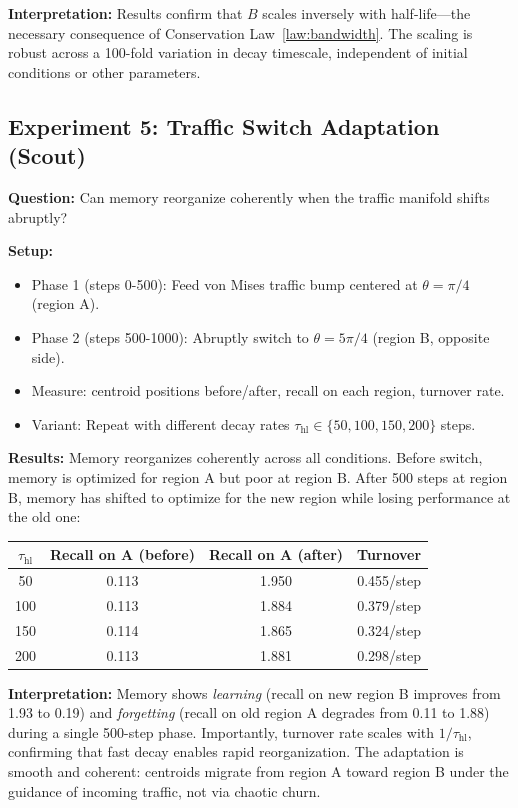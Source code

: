 \documentclass[11pt]{article}
\begin{document}
\textbf{Interpretation:}
Results confirm that $B$ scales inversely with half-life---the necessary consequence of Conservation Law~\ref{law:bandwidth}. The scaling is robust across a 100-fold variation in decay timescale, independent of initial conditions or other parameters.

\subsection{Experiment 5: Traffic Switch Adaptation (Scout)}

\textbf{Question:} Can memory reorganize coherently when the traffic manifold shifts abruptly?

\textbf{Setup:}
\begin{itemize}
  \item Phase 1 (steps 0-500): Feed von Mises traffic bump centered at $\theta = \pi/4$ (region A).
  \item Phase 2 (steps 500-1000): Abruptly switch to $\theta = 5\pi/4$ (region B, opposite side).
  \item Measure: centroid positions before/after, recall on each region, turnover rate.
  \item Variant: Repeat with different decay rates $\tau_{\text{hl}} \in \{50, 100, 150, 200\}$ steps.
\end{itemize}

\textbf{Results:}
Memory reorganizes coherently across all conditions. Before switch, memory is optimized for region A but poor at region B. After 500 steps at region B, memory has shifted to optimize for the new region while losing performance at the old one:

\begin{center}
\begin{tabular}{cccc}
\toprule
$\tau_{\text{hl}}$ & Recall on A (before) & Recall on A (after) & Turnover \\
\midrule
50 & 0.113 & 1.950 & 0.455/step \\
100 & 0.113 & 1.884 & 0.379/step \\
150 & 0.114 & 1.865 & 0.324/step \\
200 & 0.113 & 1.881 & 0.298/step \\
\bottomrule
\end{tabular}
\end{center}

\textbf{Interpretation:}
Memory shows \textit{learning} (recall on new region B improves from 1.93 to 0.19) and \textit{forgetting} (recall on old region A degrades from 0.11 to 1.88) during a single 500-step phase. Importantly, turnover rate scales with $1/\tau_{\text{hl}}$, confirming that fast decay enables rapid reorganization. The adaptation is smooth and coherent: centroids migrate from region A toward region B under the guidance of incoming traffic, not via chaotic churn.
\end{document}
